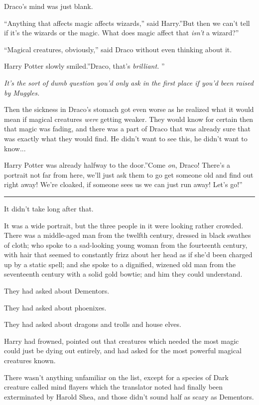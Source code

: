 Draco's mind was just blank.

``Anything that affects magic affects wizards,'' said Harry.''But then
we can't tell if it's the wizards or the magic. What does magic affect
that \emph{isn't} a wizard?''

``Magical creatures, obviously,'' said Draco without even thinking about
it.

Harry Potter slowly smiled.''Draco, that's \emph{brilliant.} ''

\emph{It's the sort of dumb question you'd only ask in the first place
if you'd been raised by Muggles.}

Then the sickness in Draco's stomach got even worse as he realized what
it would mean if magical creatures \emph{were} getting weaker. They
would know for certain then that magic was fading, and there was a part
of Draco that was already sure that was exactly what they would find. He
didn't want to see this, he didn't want to know...

Harry Potter was already halfway to the door.''Come \emph{on}, Draco!
There's a portrait not far from here, we'll just ask them to go get
someone old and find out right away! We're cloaked, if someone sees us
we can just run away! Let's go!''

\begin{center}\rule{3in}{0.4pt}\end{center}

It didn't take long after that.

It was a wide portrait, but the three people in it were looking rather
crowded. There was a middle-aged man from the twelfth century, dressed
in black swathes of cloth; who spoke to a sad-looking young woman from
the fourteenth century, with hair that seemed to constantly frizz about
her head as if she'd been charged up by a static spell; and she spoke to
a dignified, wizened old man from the seventeenth century with a solid
gold bowtie; and him they could understand.

They had asked about Dementors.

They had asked about phoenixes.

They had asked about dragons and trolls and house elves.

Harry had frowned, pointed out that creatures which needed the most
magic could just be dying out entirely, and had asked for the most
powerful magical creatures known.

There wasn't anything unfamiliar on the list, except for a species of
Dark creature called mind flayers which the translator noted had finally
been exterminated by Harold Shea, and those didn't sound half as scary
as Dementors.

